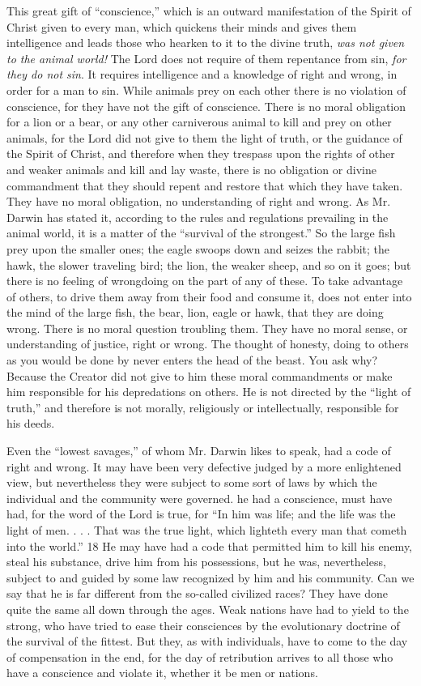 This great gift of ``conscience,'' which is an outward manifestation of the Spirit of Christ
given to every man, which quickens their minds and gives them intelligence and leads those
who hearken to it to the divine truth, \textit{was not given to the animal world!} The Lord does not
require of them repentance from sin, \textit{for they do not sin}. It requires intelligence and a
knowledge of right and wrong, in order for a man to sin. While animals prey on each other
there is no violation of conscience, for they have not the gift of conscience. There is no moral
obligation for a lion or a bear, or any other carniverous animal to kill and prey on other
animals, for the Lord did not give to them the light of truth, or the guidance of the Spirit of
Christ, and therefore when they trespass upon the rights of other and weaker animals and kill
and lay waste, there is no obligation or divine commandment that they should repent and
restore that which they have taken. They have no moral obligation, no understanding of right
and wrong. As Mr. Darwin has stated it, according to the rules and regulations prevailing in
the animal world, it is a matter of the ``survival of the strongest.'' So the large fish prey upon
the smaller ones; the eagle swoops down and seizes the rabbit; the hawk, the slower traveling
bird; the lion, the weaker sheep, and so on it goes; but there is no feeling of wrongdoing on
the part of any of these. To take advantage of others, to drive them away from their food and
consume it, does not enter into the mind of the large fish, the bear, lion, eagle or hawk, that
they are doing wrong. There is no moral question troubling them. They have no moral sense,
or understanding of justice, right or wrong. The thought of honesty, doing to others as you
would be done by never enters the head of the beast. You ask why? Because the Creator did
not give to him these moral commandments or make him responsible for his depredations on
others. He is not directed by the ``light of truth,'' and therefore is not morally, religiously or
intellectually, responsible for his deeds.

Even the ``lowest savages,'' of whom Mr. Darwin likes to speak, had a code of right and
wrong. It may have been very defective judged by a more enlightened view, but nevertheless
they were subject to some sort of laws by which the individual and the community were
governed. he had a conscience, must have had, for the word of the Lord is true, for ``In him
was life; and the life was the light of men. . . . That was the true light, which lighteth every
man that cometh into the world.'' 18 He may have had a code that permitted him to kill his
enemy, steal his substance, drive him from his possessions, but he was, nevertheless, subject
to and guided by some law recognized by him and his community. Can we say that he is far
different from the so-called civilized races? They have done quite the same all down through
the ages. Weak nations have had to yield to the strong, who have tried to ease their
consciences by the evolutionary doctrine of the survival of the fittest. But they, as with
individuals, have to come to the day of compensation in the end, for the day of retribution
arrives to all those who have a conscience and violate it, whether it be men or nations.

